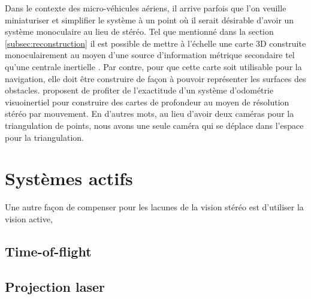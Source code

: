 Dans le contexte des micro-véhicules aériens, il arrive parfois que l'on veuille miniaturiser et simplifier le système à un point où il serait désirable d'avoir un système monoculaire au lieu de stéréo. Tel que mentionné dans la section \ref{subsec:reconstruction} il est possible de mettre à l'échelle une carte 3D construite monoculairement au moyen d'une source d'information métrique secondaire tel qu'une centrale inertielle \citep{muratal2017vimonoslam}. Par contre, pour que cette carte soit utilisable pour la navigation, elle doit être construire de façon à pouvoir représenter les surfaces des obstacles. \cite{Yang2017} proposent de profiter de l'exactitude d'un système d'odométrie visuoinertiel pour construire des cartes de profondeur au moyen de résolution stéréo par mouvement. En d'autres mots, au lieu d'avoir deux caméras pour la triangulation de points, nous avons une seule caméra qui se déplace dans l'espace pour la triangulation.

\section{Systèmes actifs}

Une autre façon de compenser pour les lacunes de la vision stéréo est d'utiliser la vision active, 

\subsection{Time-of-flight}

\subsection{Projection laser}
